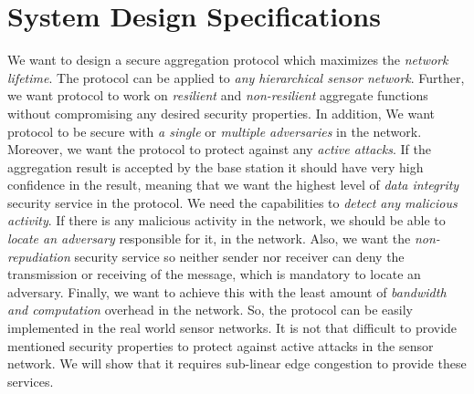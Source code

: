 
\section{System Design Specifications}
	We want to design a secure aggregation protocol which maximizes the \textit{network lifetime}.
	The protocol can be applied to \textit{any hierarchical sensor network}.
	Further, we want protocol to work on \textit{resilient} and \textit{non-resilient} aggregate functions without compromising any desired security properties.
	In addition, We want protocol to be secure with \textit{a single} or \textit{multiple adversaries} in the network.
	Moreover, we want the protocol to protect against any \textit{active attacks}. 
	If the aggregation result is accepted by the base station it should have very high confidence in the result, meaning that we want the highest level of \textit{data integrity} security service in the protocol.
	We need the capabilities to \textit{detect any malicious activity}.
	If there is any malicious activity in the network, we should be able to \textit{locate an adversary} responsible for it, in the network.
	Also, we want the \textit{non-repudiation} security service so neither sender nor receiver can deny the transmission or receiving of the message, which is mandatory to locate an adversary.
	Finally, we want to achieve this with the least amount of \textit{bandwidth and computation} overhead in the network.
	So, the protocol can be easily implemented in the real world sensor networks.
	It is not that difficult to provide mentioned security properties to protect against active attacks in the sensor network. 
	We will show that it requires sub-linear edge congestion to provide these services. 







